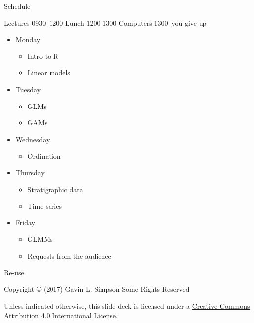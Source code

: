 \documentclass[10pt,ignorenonframetext,compress, aspectratio=169]{beamer}
\providecommand{\tightlist}{%
  \setlength{\itemsep}{0pt}\setlength{\parskip}{0pt}}
\begin{document}
\begin{frame}{Schedule}

Lectures 0930--1200 Lunch 1200-1300 Computers 1300--you give up

\begin{itemize}
\tightlist
\item
  Monday

  \begin{itemize}
  \tightlist
  \item
    Intro to R
  \item
    Linear models
  \end{itemize}
\item
  Tuesday

  \begin{itemize}
  \tightlist
  \item
    GLMs
  \item
    GAMs
  \end{itemize}
\item
  Wednesday

  \begin{itemize}
  \tightlist
  \item
    Ordination
  \end{itemize}
\item
  Thursday

  \begin{itemize}
  \tightlist
  \item
    Stratigraphic data
  \item
    Time series
  \end{itemize}
\item
  Friday

  \begin{itemize}
  \tightlist
  \item
    GLMMs
  \item
    Requests from the audience
  \end{itemize}
\end{itemize}

\end{frame}

\begin{frame}{Re-use}

Copyright © (2017) Gavin L. Simpson Some Rights Reserved

Unless indicated otherwise, this slide deck is licensed under a
\href{http://creativecommons.org/licenses/by/4.0/}{Creative Commons
Attribution 4.0 International License}.

\begin{center}
  \ccby
\end{center}

\end{frame}
\end{document}

